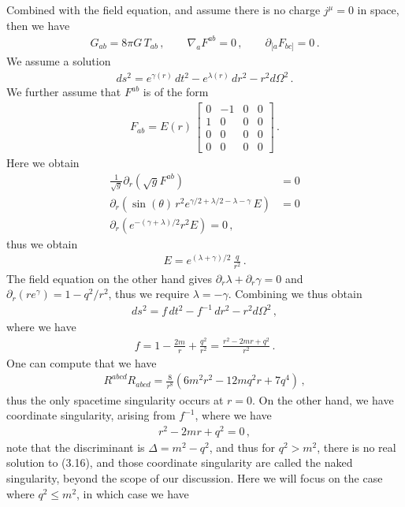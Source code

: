\documentclass[11pt, onesided]{book}
\theoremstyle{break}
\theoremstyle{break}
\newcommand{\pd}{\partial}
\newcommand{\bmat}[1]{\begin{bmatrix} #1 \end{bmatrix}}
\begin{document}
Combined with the field equation, and assume there is no charge $j^\mu = 0$ in space, then we have
\begin{align*}
G_{ab} = 8\pi G\, T_{ab}\,,\qquad
\nabla_a F^{ab} = 0 \,,\qquad
\pd_{[a}F_{bc]} = 0\,.
\end{align*}
We assume a solution
\begin{align*}
ds^2 = e^{\gamma(r)}\, dt^2 - e^{\lambda(r)}\, dr^2 - r^2 d\Omega^2\,.
\end{align*}
We further assume that $F^{ab}$ is of the form
\begin{align*}
F_{ab} = E(r) \, \bmat{0 & -1 & 0 & 0 \\ 1 & 0 & 0 & 0 \\ 0 & 0 & 0 & 0\\ 0 & 0 & 0 &0}\,.
\end{align*}
Here we obtain
\begin{align*}
\frac{1}{\sqrt{g}}\pd_r\left( \sqrt{g} F^{ab}\right) &= 0\\
\pd_r\left( \sin(\theta)\, r^2 e^{\gamma/2 + \lambda/2- \lambda - \gamma}\, E\right) &= 0\\
\pd_r(e^{-(\gamma+\lambda)/2}r^2 E) = 0\,,
\end{align*}
thus we obtain
\begin{align*}
E = e^{(\lambda + \gamma)/2}\,\frac{q}{r^2}\,.
\end{align*}
The field equation on the other hand gives $\pd_r\lambda + \pd_r\gamma = 0$ and $\pd_r(re^{\gamma}) = 1-q^2/r^2$, thus we require $\lambda = -\gamma$. Combining we thus obtain
\begin{align*}
ds^2 = f\, dt^2 - f^{-1}\, dr^2 - r^2 d\Omega^2\,,
\end{align*}
where we have
\begin{align*}
f = 1- \frac{2m}{r} + \frac{q^2}{r^2} = \frac{r^2 - 2mr + q^2}{r^2}  \,.
\end{align*}
One can compute that we have
\begin{align*}
R^{abcd}R_{abcd} = \frac{8}{r^8}\left( 6m^2 r^2 - 12 mq^2 r + 7q^4\right)\,,
\end{align*}
thus the only spacetime singularity occurs at $r = 0$. On the other hand, we have coordinate singularity, arising from $f^{-1}$, where we have
\begin{align}
r^2 - 2mr + q^2=0\,,
\end{align}
note that the discriminant is $\Delta = m^2 -q^2$, and thus for $q^2 > m^2$, there is no real solution to (3.16), and those coordinate singularity are called the naked singularity, beyond the scope of our discussion. Here we will focus on the case where $q^2 \leq m^2$, in which case we have
\end{document}
